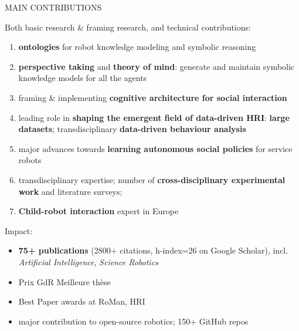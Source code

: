 \documentclass[xcolor=table]{beamer}
\makeatletter
\def\beamer@writeslidentry@miniframesoff{%
  \expandafter\beamer@ifempty\expandafter{\beamer@framestartpage}{}%
  {%
    \clearpage\beamer@notesactions%
  }
}
\newcommand*{\miniframesoff}{\let\beamer@writeslidentry=\beamer@writeslidentry@miniframesoff}
\makeatother
\begin{document}
\begin{frame}{MAIN CONTRIBUTIONS}

    Both basic research \& framing research, and technical contributions:

    {\scriptsize
    \begin{enumerate}
        \item \textbf{ontologies} for robot knowledge modeling and symbolic
            reasoning
        \item \textbf{perspective taking} and \textbf{theory of mind}: generate and
            maintain symbolic knowledge models for all the agents
        \item framing \& implementing \textbf{cognitive architecture for social interaction}
        \item leading role in \textbf{shaping the emergent field of data-driven
            HRI}: \textbf{large datasets}; transdisciplinary \textbf{data-driven behaviour analysis} 
        \item major advances towards \textbf{learning autonomous social policies} for service robots
        \item transdisciplinary expertise; number of \textbf{cross-disciplinary
            experimental work} and literature surveys;
        \item \textbf{Child-robot interaction} expert in Europe
    \end{enumerate}
    }

Impact:
    {\scriptsize
    \begin{itemize}
        \item \textbf{75+ publications} (2800+ citations, h-index=26 on Google Scholar), incl. \emph{Artificial Intelligence},
            \emph{Science Robotics}
        \item Prix GdR Meilleure thèse
        \item Best Paper awards at RoMan, HRI
        \item major contribution to open-source robotics; 150+ GitHub repos
    \end{itemize}
    }
\end{frame}


\miniframesoff{}
\end{document}

